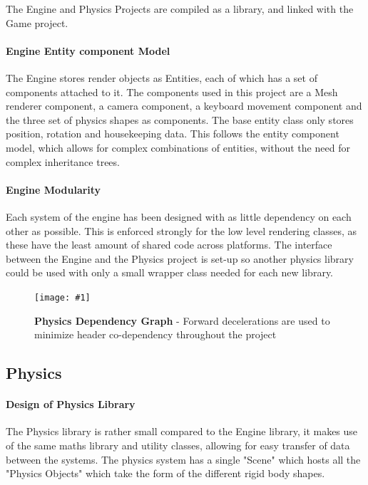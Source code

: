 \documentclass[conference]{acmsiggraph}
\newcommand{\figuremacroW}[4]{
	\begin{figure}[h] %
		\centering
		\texttt{[image: \#1]}
		\caption[#2]{\textbf{#2} - #3}
		\label{fig:#1}
	\end{figure}
}
\begin{document}
The Engine and Physics Projects are compiled as a library, and linked with the Game project.

\paragraph{Engine Entity component Model}
The Engine stores render objects as Entities, each of which has a set of components attached to it.
The components used in this project are a Mesh renderer component, a camera component, a keyboard movement component and the three set of physics shapes as components. The base entity class only stores  position, rotation and housekeeping data.
This follows the entity component model, which allows for complex combinations of entities, without the need for complex inheritance trees.

\paragraph{Engine Modularity}
Each system of the engine has been designed with as little dependency on each other as possible. This is enforced strongly for the low level rendering classes, as these have the least amount of shared code across platforms. The interface between the Engine and the Physics project is set-up so another physics library could be used with only a small wrapper class needed for each new library.

\figuremacroW
{physicsclasses}
{Physics Dependency Graph}
{Forward decelerations are used to minimize header co-dependency throughout the project}
{1.0}

\subsection{Physics}
\paragraph{Design of Physics Library}
The Physics library is rather small compared to the Engine library, it makes use of the same maths library and utility classes, allowing for easy transfer of data between the systems. The physics system has a single "Scene" which hosts all the "Physics Objects" which take the form of the different rigid body shapes.
\end{document}

